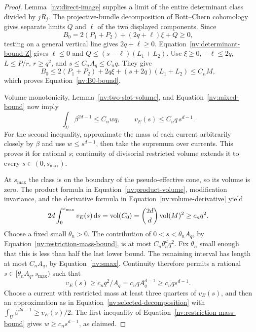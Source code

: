 \begin{proof}
Lemma~\ref{nv:direct-image} supplies a limit of the entire determinant
class divided by \(jR_j\).  The projective-bundle decomposition of
Bott--Chern cohomology gives separate limits \(Q\) and \(\ell\) of
the two displayed components.  Since
\[
 B_0=2(P_1+P_2)+(2q+\ell)\xi+Q\ge0,
\]
testing on a general vertical line gives \(2q+\ell\ge0\).
Equation~\eqref{nv:determinant-bound-Z} gives \(\ell\le0\) and
\(Q\le(s-\ell)(L_1+L_2)\).  Use \(\xi\ge0\), \(-\ell\le2q\),
\(L\le P/r\), \(r\ge q^2\), and \(s\le C_nA_q\le C_nq\).
They give
\[
 B_0\le2(P_1+P_2)+2q\xi+(s+2q)(L_1+L_2)
       \le C_nM,
\]
which proves Equation~\eqref{nv:B0-bound}.

Volume monotonicity, Lemma~\ref{nv:two-slot-volume}, and
Equation~\eqref{nv:mixed-bound} now imply
\begin{equation}\label{nv:restriction-mass-bound}
 \int_U\beta^{2d-1}\le C_nwq,\qquad
 v_E(s)\le C_nq\,s^{d-1}.
\end{equation}
For the second inequality, approximate the mass of each current
arbitrarily closely by \(\beta\) and use \(w\le s^{d-1}\), then take
the supremum over currents.  This proves it for rational \(s\);
continuity of divisorial restricted volume extends it to every
\(s\in(0,s_{\max})\).

At \(s_{\max}\) the class is on the boundary of the pseudo-effective
cone, so its volume is zero.  The product formula in
Equation~\eqref{nv:product-volume}, modification invariance, and the derivative
formula in Equation~\eqref{nv:volume-derivative} yield
\begin{equation}\label{nv:total-diagonal-mass}
 2d\int_0^{s_{\max}}v_E(s)\,\mathrm d s
  =\operatorname{vol}(C_0)
  =\binom{2d}{d}\operatorname{vol}(M)^2
  \ge c_nq^2 .
\end{equation}
Choose a fixed small \(\theta_n>0\).  The contribution of
\(0<s<\theta_nA_q\), by Equation~\eqref{nv:restriction-mass-bound}, is at
most \(C_n\theta_n^d q^2\).  Fix \(\theta_n\) small enough that this
is less than half the last lower bound.  The remaining interval has
length at most \(C_nA_q\), by Equation~\eqref{nv:smax}.  Continuity therefore
permits a rational \(s\in[\theta_nA_q,s_{\max})\) such that
\[
 v_E(s)\ge c_nq^2/A_q=c_nqA_q^{d-1}
             \ge c_nq s^{d-1}.
\]
Choose a current with restricted mass at least three quarters of
\(v_E(s)\), and then an approximation as in
Equation~\eqref{nv:selected-decomposition} with
\(\int_U\beta^{2d-1}\ge v_E(s)/2\).  The first inequality of
 Equation~\eqref{nv:restriction-mass-bound} gives
 \(w\ge c_ns^{d-1}\), as claimed.
\end{proof}

